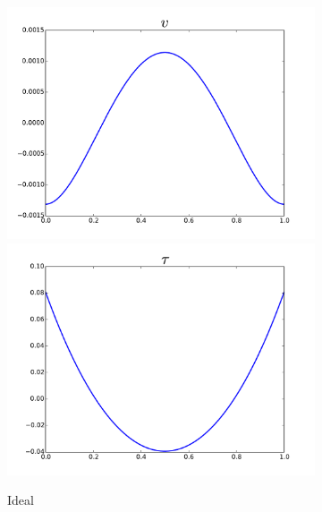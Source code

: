 \documentclass[Dissertation.tex]{subfiles}
\begin{document}
\begin{figure}[ht]
\centering
\begin{subfigure}[t]{0.45\textwidth}
\centering
\includegraphics[width=\textwidth]{OptimalTestFunctions/uLinear_1e-2/steady/coupledrobust_steady_v}\\
\includegraphics[width=\textwidth]{OptimalTestFunctions/uLinear_1e-2/steady/coupledrobust_steady_tau}\\
\caption{Ideal}
\label{fig:idealCoupledRobust}
\end{subfigure}
\begin{subfigure}[t]{0.45\textwidth}
\centering

\end{subfigure}
\end{figure}
\end{document}
